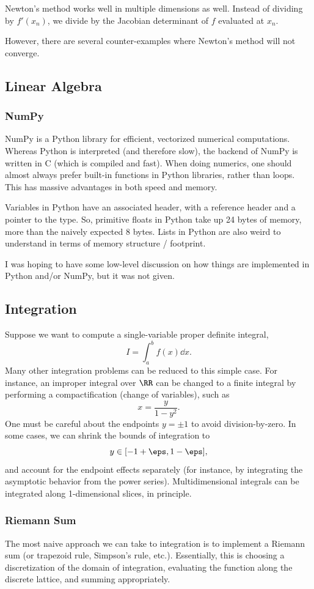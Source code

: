 \documentclass[12pt,letterpaper]{article}
\begin{document}
Newton's method works well in multiple dimensions as well. Instead of dividing by $f'(x_n)$, we divide by the Jacobian determinant of $f$ evaluated at $x_n$.

However, there are several counter-examples where Newton's method will not converge.
\subsection{Linear Algebra}
\subsubsection{NumPy}
NumPy is a Python library for efficient, vectorized numerical computations. Whereas Python is interpreted (and therefore slow), the backend of NumPy is written in C (which is compiled and fast). When doing numerics, one should almost always prefer built-in functions in Python libraries, rather than loops. This has massive advantages in both speed and memory.

Variables in Python have an associated header, with a reference header and a pointer to the type. So, primitive floats in Python take up 24 bytes of memory, more than the naively expected 8 bytes. Lists in Python are also weird to understand in terms of memory structure / footprint.

I was hoping to have some low-level discussion on how things are implemented in Python and/or NumPy, but it was not given.
\subsection{Integration}
Suppose we want to compute a single-variable proper definite integral,
\[I=\int_a^bf(x)\dd{x}.\]
Many other integration problems can be reduced to this simple case. For instance, an improper integral over $\RR$ can be changed to a finite integral by performing a compactification (change of variables), such as
\[x=\frac y{1-y^2}.\]
One must be careful about the endpoints $y=\pm1$ to avoid division-by-zero. In some cases, we can shrink the bounds of integration to
\[y\in[-1+\eps,1-\eps],\]
and account for the endpoint effects separately (for instance, by integrating the asymptotic behavior from the power series). Multidimensional integrals can be integrated along 1-dimensional slices, in principle.
\subsubsection{Riemann Sum}
The most naive approach we can take to integration is to implement a Riemann sum (or trapezoid rule, Simpson's rule, etc.). Essentially, this is choosing a discretization of the domain of integration, evaluating the function along the discrete lattice, and summing appropriately.
\end{document}
